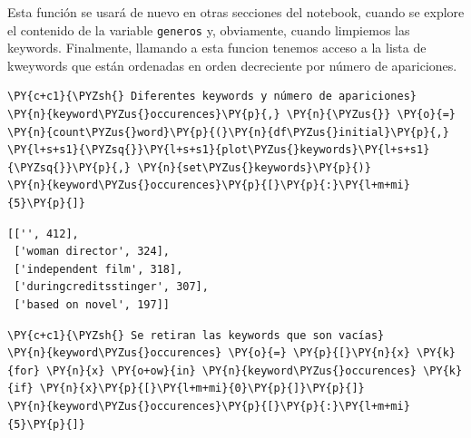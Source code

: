     Esta función se usará de nuevo en otras secciones del notebook, cuando
se explore el contenido de la variable \texttt{generos} y, obviamente,
cuando limpiemos las keywords. Finalmente, llamando a esta funcion
tenemos acceso a la lista de kweywords que están ordenadas en orden
decreciente por número de apariciones.

    \begin{tcolorbox}[breakable, size=fbox, boxrule=1pt, pad at break*=1mm,colback=cellbackground, colframe=cellborder]
\begin{Verbatim}[commandchars=\\\{\}]
\PY{c+c1}{\PYZsh{} Diferentes keywords y número de apariciones}
\PY{n}{keyword\PYZus{}occurences}\PY{p}{,} \PY{n}{\PYZus{}} \PY{o}{=} \PY{n}{count\PYZus{}word}\PY{p}{(}\PY{n}{df\PYZus{}initial}\PY{p}{,} \PY{l+s+s1}{\PYZsq{}}\PY{l+s+s1}{plot\PYZus{}keywords}\PY{l+s+s1}{\PYZsq{}}\PY{p}{,} \PY{n}{set\PYZus{}keywords}\PY{p}{)}
\PY{n}{keyword\PYZus{}occurences}\PY{p}{[}\PY{p}{:}\PY{l+m+mi}{5}\PY{p}{]}
\end{Verbatim}
\end{tcolorbox}

            \begin{tcolorbox}[breakable, boxrule=.5pt, size=fbox, pad at break*=1mm, opacityfill=0]
\begin{Verbatim}[commandchars=\\\{\}]
[['', 412],
 ['woman director', 324],
 ['independent film', 318],
 ['duringcreditsstinger', 307],
 ['based on novel', 197]]
\end{Verbatim}
\end{tcolorbox}
        
    \begin{tcolorbox}[breakable, size=fbox, boxrule=1pt, pad at break*=1mm,colback=cellbackground, colframe=cellborder]
\begin{Verbatim}[commandchars=\\\{\}]
\PY{c+c1}{\PYZsh{} Se retiran las keywords que son vacías}
\PY{n}{keyword\PYZus{}occurences} \PY{o}{=} \PY{p}{[}\PY{n}{x} \PY{k}{for} \PY{n}{x} \PY{o+ow}{in} \PY{n}{keyword\PYZus{}occurences} \PY{k}{if} \PY{n}{x}\PY{p}{[}\PY{l+m+mi}{0}\PY{p}{]}\PY{p}{]}
\PY{n}{keyword\PYZus{}occurences}\PY{p}{[}\PY{p}{:}\PY{l+m+mi}{5}\PY{p}{]}
\end{Verbatim}
\end{tcolorbox}

